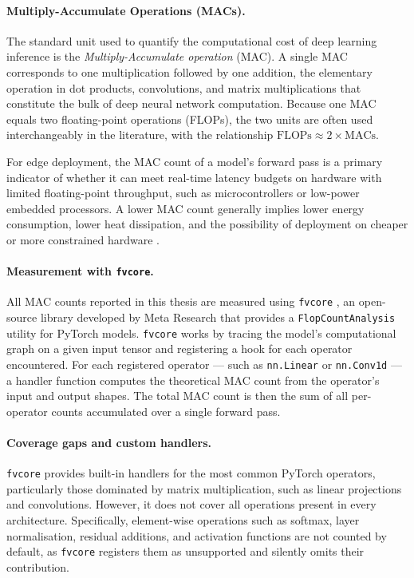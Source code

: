 \documentclass[twoside,11pt,openright]{report}
\begin{document}
\paragraph{Multiply-Accumulate Operations (MACs).}
The standard unit used to quantify the computational cost of deep learning inference
is the \emph{Multiply-Accumulate operation} (MAC). A single MAC corresponds to one
multiplication followed by one addition, the elementary operation in dot products,
convolutions, and matrix multiplications that constitute the bulk of deep neural
network computation. Because one MAC equals two floating-point operations (FLOPs),
the two units are often used interchangeably in the literature, with the relationship
$\mathrm{FLOPs} \approx 2 \times \mathrm{MACs}$.

For edge deployment, the MAC count of a model's forward pass is a primary indicator
of whether it can meet real-time latency budgets on hardware with limited floating-point
throughput, such as microcontrollers or low-power embedded processors. A lower MAC
count generally implies lower energy consumption, lower heat dissipation, and the
possibility of deployment on cheaper or more constrained hardware \citep{camus2019review}.

\paragraph{Measurement with \texttt{fvcore}.}
All MAC counts reported in this thesis are measured using \texttt{fvcore} \cite{fvcore}, an open-source
library developed by Meta Research that provides a \texttt{FlopCountAnalysis} utility for
PyTorch models. \texttt{fvcore} works by tracing the model's computational graph on a
given input tensor and registering a hook for each operator encountered. For each
registered operator — such as \texttt{nn.Linear} or \texttt{nn.Conv1d} — a handler function computes the theoretical MAC count from the
operator's input and output shapes. The total MAC count is then the sum of all
per-operator counts accumulated over a single forward pass.

\paragraph{Coverage gaps and custom handlers.}
\texttt{fvcore} provides built-in handlers for the most common PyTorch operators,
particularly those dominated by matrix multiplication, such as linear projections and
convolutions. However, it does not cover all operations present in every architecture.
Specifically, element-wise operations such as softmax, layer normalisation, residual
additions, and activation functions are not counted by default, as \texttt{fvcore}
registers them as unsupported and silently omits their contribution.
\end{document}
